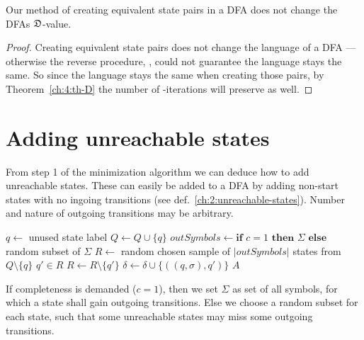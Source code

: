 \begin{corollary}
	Our method of creating equivalent state pairs in a DFA does not change the DFAs $\mathfrak{D}$-value.
\end{corollary}

\begin{proof}
	Creating equivalent state pairs does not change the language of a DFA --- otherwise the reverse procedure, \MinAlg, could not guarantee the language stays the same. So since the language stays the same when creating those pairs, by Theorem~\ref{ch:4:th-D} the number of \CompDist-iterations will preserve as well.
\end{proof}

\section{Adding unreachable states}

From step 1 of the minimization algorithm we can deduce how to add unreachable states. These can easily be added to a DFA by adding non-start states with no ingoing transitions (see def.~\ref{ch:2:unreachable-states}). Number and nature of outgoing transitions may be arbitrary.

\vspace{0.2cm}
\begin{algorithmic}[1]
		\State $q \gets$ unused state label
		\State $Q \gets Q \cup \{ q \}$
        \State $outSymbols \gets \textbf{if } c = 1 \textbf{ then } \Sigma \textbf{ else}$ random subset of $\Sigma$
		\State $R \gets$ random chosen sample of $|outSymbols|$ states from $Q \setminus \{q\}$
			\State $q' \in R$
			\State $R \gets R \setminus \{q'\}$
			\State $\delta \gets \delta \cup \{ ((q, \sigma), q') \}$
		\EndFor
	\EndFor
	\State \Return $A$
	\EndFunction
\end{algorithmic}
\vspace{0.2cm}
If completeness is demanded ($c=1$), then we set $\Sigma$ as set of all symbols, for which a state shall gain outgoing transitions. Else we choose a random subset for each state, such that some unreachable states may miss some outgoing transitions.
